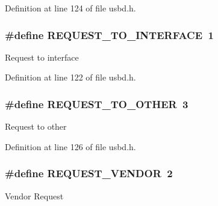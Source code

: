 Definition at line 124 of file usbd.\+h.

\subsubsection[{\texorpdfstring{R\+E\+Q\+U\+E\+S\+T\+\_\+\+T\+O\+\_\+\+I\+N\+T\+E\+R\+F\+A\+CE}{REQUEST_TO_INTERFACE}}]{\setlength{\rightskip}{0pt plus 5cm}\#define R\+E\+Q\+U\+E\+S\+T\+\_\+\+T\+O\+\_\+\+I\+N\+T\+E\+R\+F\+A\+CE~1}\hypertarget{group__USBD__Core_ga0e5e473281fc9c1ee1ea446823c02623}{}\label{group__USBD__Core_ga0e5e473281fc9c1ee1ea446823c02623}
Request to interface 

Definition at line 122 of file usbd.\+h.

\subsubsection[{\texorpdfstring{R\+E\+Q\+U\+E\+S\+T\+\_\+\+T\+O\+\_\+\+O\+T\+H\+ER}{REQUEST_TO_OTHER}}]{\setlength{\rightskip}{0pt plus 5cm}\#define R\+E\+Q\+U\+E\+S\+T\+\_\+\+T\+O\+\_\+\+O\+T\+H\+ER~3}\hypertarget{group__USBD__Core_gad1f005d9ae04da7324d465a86e489af5}{}\label{group__USBD__Core_gad1f005d9ae04da7324d465a86e489af5}
Request to other 

Definition at line 126 of file usbd.\+h.

\subsubsection[{\texorpdfstring{R\+E\+Q\+U\+E\+S\+T\+\_\+\+V\+E\+N\+D\+OR}{REQUEST_VENDOR}}]{\setlength{\rightskip}{0pt plus 5cm}\#define R\+E\+Q\+U\+E\+S\+T\+\_\+\+V\+E\+N\+D\+OR~2}\hypertarget{group__USBD__Core_ga40131e4daec200a7d931c2b26e43d27f}{}\label{group__USBD__Core_ga40131e4daec200a7d931c2b26e43d27f}
Vendor Request 

